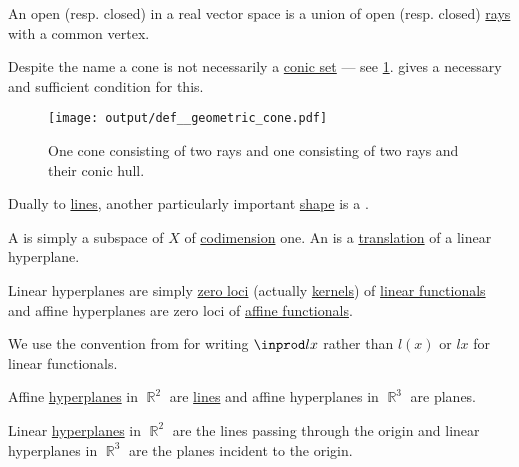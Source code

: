 \begin{definition}\label{def:geometric_cone}
  An open (resp. closed)  in a real vector space is a union of open (resp. closed) \hyperref[def:geometric_ray]{rays} with a common vertex.

  Despite the name a cone is not necessarily a \hyperref[def:conic_hull]{conic set} --- see \cref{fig:def:geometric_cone}.  gives a necessary and sufficient condition for this.

  \begin{figure}[!ht]
    \centering
    \texttt{[image: output/def\_\_geometric\_cone.pdf]}
    \caption{One cone consisting of two rays and one consisting of two rays and their conic hull.}\label{fig:def:geometric_cone}
  \end{figure}
\end{definition}

\begin{definition}\label{def:hyperplane}
  Dually to \hyperref[def:geometric_line]{lines}, another particularly important \hyperref[def:geometric_shape]{shape} is a .

  \begin{thmenum}
     A  is simply a subspace of \( X \) of \hyperref[thm:vector_space_dimension]{codimension} one. An  is a \hyperref[def:rigid_motion/translation]{translation} of a linear hyperplane.

     Linear hyperplanes are simply \hyperref[def:zero_locus]{zero loci} (actually \hyperref[def:module/kernel]{kernels}) of \hyperref[def:semimodule/homomorphism]{linear functionals} and affine hyperplanes are zero loci of \hyperref[def:affine_operator]{affine functionals}.

    We use the convention from  for writing \( \inprod l x \) rather than \( l(x) \) or \( lx \) for linear functionals.
  \end{thmenum}
\end{definition}

\begin{example}\label{ex:hyperplanes}
  Affine \hyperref[def:hyperplane]{hyperplanes} in \( \BbbR^2 \) are \hyperref[def:geometric_line]{lines} and affine hyperplanes in \( \BbbR^3 \) are planes.

  Linear \hyperref[def:hyperplane]{hyperplanes} in \( \BbbR^2 \) are the lines passing through the origin and linear hyperplanes in \( \BbbR^3 \) are the planes incident to the origin.
\end{example}

